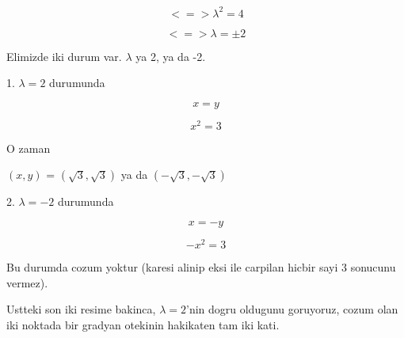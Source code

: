\documentclass[12pt,fleqn]{article}
\begin{document}
\[ <=> \lambda^2 = 4 \]

\[ <=> \lambda = \pm 2 \]

Elimizde iki durum var. $\lambda$ ya 2, ya da -2. 

1. $\lambda = 2$ durumunda

\[ x = y \]

\[ x^2 = 3 \]

O zaman

$(x,y)$ = $(\sqrt{3}, \sqrt{3})$ ya da $(-\sqrt{3}, -\sqrt{3})$ 

2. $\lambda = -2$ durumunda

\[ x = -y \]

\[ -x^2 = 3 \]

Bu durumda cozum yoktur (karesi alinip eksi ile carpilan hicbir sayi 3
sonucunu vermez). 

Ustteki son iki resime bakinca, $\lambda = 2$'nin dogru oldugunu goruyoruz,
cozum olan iki noktada bir gradyan otekinin hakikaten tam iki kati. 
\end{document}
